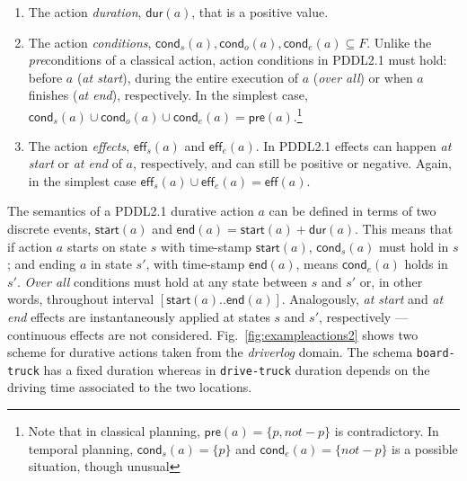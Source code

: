 \documentclass{ecai}
\newcommand{\pre}{\mathsf{pre}}    %
\newcommand{\eff}{\mathsf{eff}}    %
\newcommand{\cond}{\mathsf{cond}}  %
\newcommand{\dur}{\mathsf{dur}}    %
\newcommand{\start}{\mathsf{start}}%
\newcommand{\en}{\mathsf{end}}     %
\begin{document}
\begin{enumerate}
\item The action {\em duration}, $\dur(a)$, that is a positive value.
\item The action {\em conditions}, $\cond_s(a), \cond_o(a), \cond_e(a) \subseteq F$. Unlike the \emph{pre}conditions of a classical action, action conditions in PDDL2.1 must hold: before $a$ ({\em at start}), during the entire execution of $a$ ({\em over all}) or when $a$ finishes ({\em at end}), respectively. In the simplest case, $\cond_s(a) \cup \cond_o(a) \cup \cond_e(a) = \pre(a).$\footnote{Note that in classical planning, $\pre(a)=\{p,not-p\}$ is contradictory. In temporal planning, $\cond_s(a)=\{p\}$ and $\cond_e(a)=\{not-p\}$ is a possible situation, though unusual}
\item The action {\em effects}, $\eff_s(a)$ and $\eff_e(a)$. In PDDL2.1 effects can happen {\em at start} or {\em at end} of $a$, respectively, and can still be positive or negative. Again, in the simplest case $\eff_s(a) \cup \eff_e(a) = \eff(a)$.
\end{enumerate}



The semantics of a PDDL2.1 durative action $a$ can be defined in terms of two discrete events, $\start(a)$ and $\en(a)=\start(a)+\dur(a)$. This means that if action $a$ starts on state $s$ with time-stamp $\start(a)$, $\cond_s(a)$ must hold in $s$; and ending $a$ in state $s'$, with time-stamp $\en(a)$, means $\cond_e(a)$ holds in $s'$. {\em Over all} conditions must hold at any state between $s$ and $s'$ or, in other words, throughout interval $[\start(a)..\en(a)]$. Analogously, {\em at start} and {\em at end} effects are instantaneously applied at states $s$ and $s'$, respectively ---continuous effects are not considered. Fig.~\ref{fig:exampleactions2} shows two scheme for durative actions taken from the {\em driverlog} domain. The schema \texttt{board-truck} has a fixed duration whereas in \texttt{drive-truck} duration depends on the driving time associated to the two locations.
\end{document}
